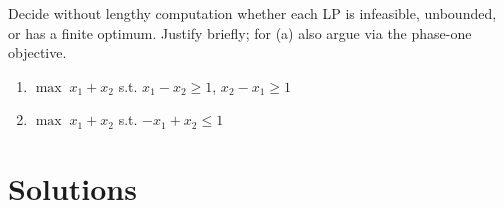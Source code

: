 \begin{problems}
  \item Decide without lengthy computation whether each LP is infeasible,
        unbounded, or has a finite optimum. Justify briefly; for (a) also
        argue via the phase-one objective.
        \begin{enumerate}[label=(\alph*),leftmargin=1.8em,itemsep=0.3ex]
          \item $\max\; x_1+x_2$ \;s.t.\; $x_1-x_2\ge 1$,\; $x_2-x_1\ge 1$
          \item $\max\; x_1+x_2$ \;s.t.\; $-x_1+x_2\le 1$
        \end{enumerate}
\end{problems}

\section{Solutions}

